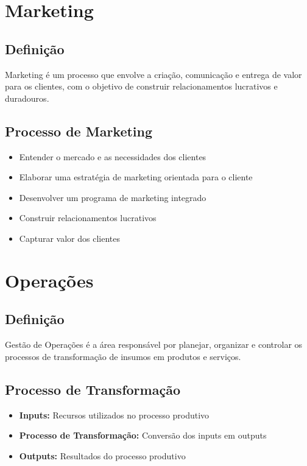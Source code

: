 \documentclass{article}
\begin{document}
\section{Marketing}

\subsection{Definição}
Marketing é um processo que envolve a criação, comunicação e entrega de valor para os clientes, com o objetivo de construir relacionamentos lucrativos e duradouros.

\subsection{Processo de Marketing}
\begin{itemize}
    \item Entender o mercado e as necessidades dos clientes
    \item Elaborar uma estratégia de marketing orientada para o cliente
    \item Desenvolver um programa de marketing integrado
    \item Construir relacionamentos lucrativos
    \item Capturar valor dos clientes
\end{itemize}

\section{Operações}

\subsection{Definição}
Gestão de Operações é a área responsável por planejar, organizar e controlar os processos de transformação de insumos em produtos e serviços.

\subsection{Processo de Transformação}
\begin{itemize}
    \item \textbf{Inputs:} Recursos utilizados no processo produtivo
    \item \textbf{Processo de Transformação:} Conversão dos inputs em outputs
    \item \textbf{Outputs:} Resultados do processo produtivo
\end{itemize}
\end{document}
